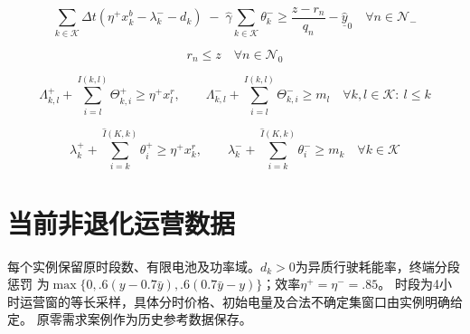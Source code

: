 \documentclass[11pt]{ctexart}
\begin{document}
\begin{equation}
\sum_{k \in \mathcal K} \Delta t \left( \eta^+x_k^b - \lambda_k^- - d_k \right)
\;-\; \hat{\gamma}\sum_{k \in \mathcal K}\theta_k^-
\ge \frac{z - r_n}{q_n} - \hat{\underline y}_0
\quad \forall n \in \mathcal N_-
\tag{32}
\end{equation}

\begin{equation}
r_n \le z
\quad \forall n \in \mathcal N_0
\tag{33}
\end{equation}

\begin{equation}
\Lambda_{k,l}^+ + \sum_{i=l}^{I(k,l)} \Theta_{k,i}^+ \ge \eta^+ x_l^r,\qquad
\Lambda_{k,l}^- + \sum_{i=l}^{I(k,l)} \Theta_{k,i}^- \ge m_l
\quad \forall k,l \in \mathcal K:\ l \le k
\tag{34}
\end{equation}

\begin{equation}
\lambda_k^+ + \sum_{i=k}^{\hat I(K,k)} \theta_i^+ \ge \eta^+ x_k^r,\qquad
\lambda_k^- + \sum_{i=k}^{\hat I(K,k)} \theta_i^- \ge m_k
\quad \forall k \in \mathcal K
\tag{35}
\end{equation}


\section*{当前非退化运营数据}
每个实例保留原时段数、有限电池及功率域。$d_k>0$为异质行驶耗能率，终端分段惩罚
为$\max\{0,.6(y-0.7\bar y),.6(0.7\bar y-y)\}$；效率$\eta^+=\eta^-=.85$。
时段为4小时运营窗的等长采样，具体分时价格、初始电量及合法不确定集窗口由实例明确给定。
原零需求案例作为历史参考数据保存。
\end{document}

